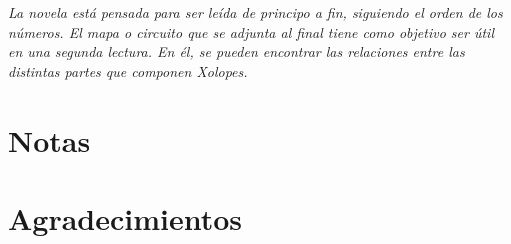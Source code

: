 \documentclass[12pt,twoside,openright,a5paper]{book}
\begin{document}
\begin{center}
\vspace*{\fill}
\emph{La novela está pensada para ser leída de principo a fin,
siguiendo el orden de los números. El mapa
o circuito que se adjunta al final tiene como objetivo ser útil
en una segunda lectura. En él, se pueden encontrar las
relaciones entre las distintas partes que componen \emph{Xolopes}.}
\vspace*{\fill}
\end{center}



\cleardoublepage

\section*{Notas}



\cleardoublepage

\section*{Agradecimientos}




%

%
\end{document}
